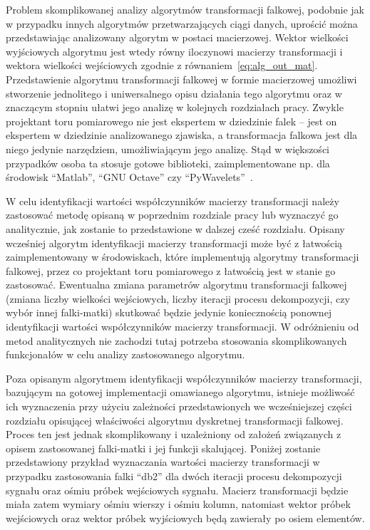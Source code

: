 Problem skomplikowanej analizy algorytmów transformacji falkowej, podobnie jak w przypadku innych algorytmów przetwarzających ciągi danych, uprościć można przedstawiając analizowany algorytm w postaci macierzowej. Wektor wielkości wyjściowych algorytmu jest wtedy równy iloczynowi macierzy transformacji i wektora wielkości wejściowych zgodnie z równaniem~\eqref{eq:alg_out_mat}. Przedstawienie algorytmu transformacji falkowej w formie macierzowej umożliwi stworzenie jednolitego i uniwersalnego opisu działania tego algorytmu oraz w znaczącym stopniu ułatwi jego analizę w kolejnych rozdziałach pracy. Zwykle projektant toru pomiarowego nie jest ekspertem w dziedzinie falek -- jest on ekspertem w dziedzinie analizowanego zjawiska, a transformacja falkowa jest dla niego jedynie narzędziem, umożliwiającym jego analizę. Stąd w większości przypadków osoba ta stosuje gotowe biblioteki, zaimplementowane np. dla środowisk \enquote{Matlab}, \enquote{GNU Octave} czy \enquote{PyWavelets}~\cite{lee_pywavelets, misiti_matlabwav}.

W celu identyfikacji wartości współczynników macierzy transformacji należy zastosować metodę opisaną w poprzednim rozdziale pracy lub wyznaczyć go analitycznie, jak zostanie to przedstawione w dalszej cześć rozdziału. Opisany wcześniej algorytm identyfikacji macierzy transformacji może być z łatwością zaimplementowany w środowiskach, które implementują algorytmy transformacji falkowej, przez co projektant toru pomiarowego z łatwością jest w stanie go zastosować. Ewentualna zmiana parametrów algorytmu transformacji falkowej (zmiana liczby wielkości wejściowych, liczby iteracji procesu dekompozycji, czy wybór innej falki-matki) skutkować będzie jedynie koniecznością ponownej identyfikacji wartości współczynników macierzy transformacji. W odróżnieniu od metod analitycznych nie zachodzi tutaj potrzeba stosowania skomplikowanych funkcjonałów w celu analizy zastosowanego algorytmu.

Poza opisanym algorytmem identyfikacji współczynników macierzy transformacji, bazującym na gotowej implementacji omawianego algorytmu, istnieje możliwość ich wyznaczenia przy użyciu zależności przedstawionych we wcześniejszej części rozdziału opisującej właściwości algorytmu dyskretnej transformacji falkowej. Proces ten jest jednak skomplikowany i uzależniony od założeń związanych z opisem zastosowanej falki-matki i jej funkcji skalującej. Poniżej zostanie przedstawiony przykład wyznaczania wartości macierzy transformacji w przypadku zastosowania falki \enquote{db2} dla dwóch iteracji procesu dekompozycji sygnału oraz ośmiu próbek wejściowych sygnału. Macierz transformacji będzie miała zatem wymiary ośmiu wierszy i ośmiu kolumn, natomiast wektor próbek wejściowych oraz wektor próbek wyjściowych będą zawierały po osiem elementów.

